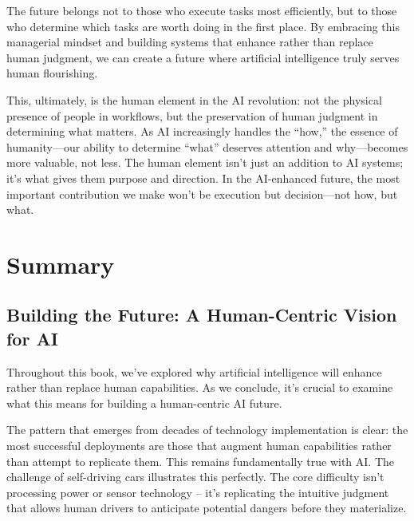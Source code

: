 \documentclass[
  Letterpaper,
]{scrbook}
\begin{document}
The future belongs not to those who execute tasks most efficiently, but
to those who determine which tasks are worth doing in the first place.
By embracing this managerial mindset and building systems that enhance
rather than replace human judgment, we can create a future where
artificial intelligence truly serves human flourishing.

This, ultimately, is the human element in the AI revolution: not the
physical presence of people in workflows, but the preservation of human
judgment in determining what matters. As AI increasingly handles the
``how,'' the essence of humanity---our ability to determine ``what''
deserves attention and why---becomes more valuable, not less. The human
element isn't just an addition to AI systems; it's what gives them
purpose and direction. In the AI-enhanced future, the most important
contribution we make won't be execution but decision---not how, but
what.


\chapter*{Summary}\label{summary}


\section*{Building the Future: A Human-Centric Vision for
AI}\label{building-the-future-a-human-centric-vision-for-ai-1}


Throughout this book, we've explored why artificial intelligence will
enhance rather than replace human capabilities. As we conclude, it's
crucial to examine what this means for building a human-centric AI
future.

The pattern that emerges from decades of technology implementation is
clear: the most successful deployments are those that augment human
capabilities rather than attempt to replicate them. This remains
fundamentally true with AI. The challenge of self-driving cars
illustrates this perfectly. The core difficulty isn't processing power
or sensor technology -- it's replicating the intuitive judgment that
allows human drivers to anticipate potential dangers before they
materialize.
\end{document}
